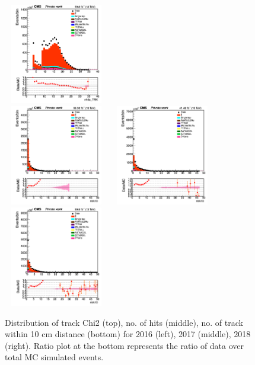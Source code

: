 \documentclass{cernatlasnote}
\begin{document}
\begin{figure}[htp]
 \includegraphics[width=4.6cm, height=4.4cm]{images/emu_channel/2018/18_Range_0pt2_1pt8/track_nhits_TRK_Linear.png}\\
\includegraphics[width=4.6cm, height=4.4cm]{images/emu_channel/2016/16_Range_0pt2_1pt8/track_ntrk10_TRK_Linear.png}
\includegraphics[width=4.6cm, height=4.4cm]{images/emu_channel/2017/17_Range_0pt2_1pt8/track_ntrk10_TRK_Linear.png}
 \includegraphics[width=4.6cm, height=4.4cm]{images/emu_channel/2018/18_Range_0pt2_1pt8/track_ntrk10_TRK_Linear.png}\\
  \caption{Distribution of track Chi2 (top), no. of hits  (middle), no. of track within 10 cm distance (bottom) for 2016 (left), 2017 (middle), 2018 (right). Ratio plot at the bottom represents the ratio of data over total MC simulated events.}
 \label{fig:L0DATAMC}
  \end{figure}
\end{document}
